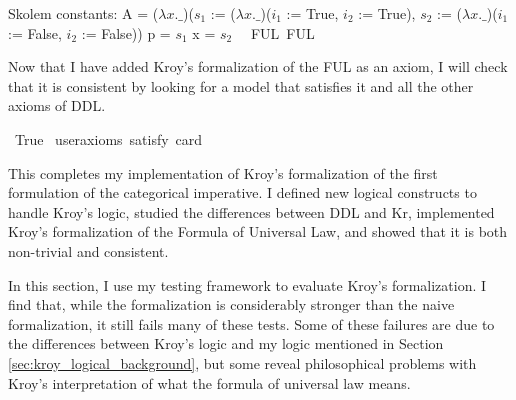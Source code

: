 \begin{isabellebody}
{  Skolem constants:
    A = ($\lambda x. \_$)($s_1$ := ($\lambda x. \_$)($i_1$ := True, $i_2$ := True), $s_2$ := ($\lambda x. \_$)($i_1$ := False, $i_2$ := False))
    p = $s_1$
    x = $s_2$\color{black}%
}%
\endisatagproof
{\isafoldproof}%
%
\isadelimproof
%
\endisadelimproof
\isanewline
\isanewline
{}\isamarkupfalse%
\ \ FUL{\isacharcolon}\ FUL%
\begin{isamarkuptext}%
Now that I have added Kroy's formalization of the FUL as an axiom, I will check that it is 
consistent by looking for a model that satisfies it and all the other axioms of DDL.%
\end{isamarkuptext}\isamarkuptrue%
\isamarkupfalse%
\ True\ \isamarkupfalse%
{\isacharbrackleft}user{\isacharunderscore}axioms{\isacharcomma}\ satisfy{\isacharcomma}\ card{\isacharequal}{}{\isacharbrackright}%
\isadelimproof
\ %
\endisadelimproof
%
\isatagproof
{}\isamarkupfalse%
\isanewline
%
%
\endisatagproof
{\isafoldproof}%
%
\isadelimproof
%
\endisadelimproof
%
\begin{isamarkuptext}%
This completes my implementation of Kroy's formalization of the first formulation of the 
categorical imperative. I defined new logical constructs to handle Kroy's logic, studied the differences
between DDL and Kr, implemented Kroy's formalization of the Formula of Universal Law, and showed 
that it is both non-trivial and consistent.%
\end{isamarkuptext}\isamarkuptrue%
%
\isadelimdocument
%
\endisadelimdocument
%
\isatagdocument
%
\isamarkuptrue%
%
\endisatagdocument
{\isafolddocument}%
%
\isadelimdocument
%
\endisadelimdocument
%
\begin{isamarkuptext}%
In this section, I use my testing framework to evaluate Kroy's formalization. I find that, while 
        the formalization is considerably
        stronger than the naive formalization, it still fails many of these tests. Some of these failures 
        are due to the differences between Kroy's logic and my logic mentioned in Section \ref{sec:kroy_logical_background}, but some 
        reveal philosophical problems with Kroy's interpretation of what the formula of universal law means.


\end{isamarkuptext}
\end{isabellebody}
